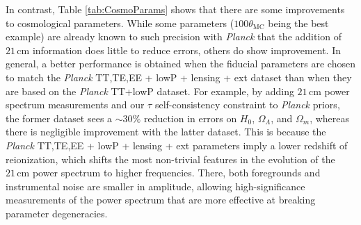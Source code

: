 \documentclass[twocolumn,aps,prd,nofootinbib,showpacs]{revtex4-1}
\begin{document}
In contrast, Table \ref{tab:CosmoParams} shows that there are some improvements to cosmological parameters. While some parameters ($100 \theta_\textrm{MC}$ being the best example) are already known to such precision with \emph{Planck} that the addition of $21\,\textrm{cm}$ information does little to reduce errors, others do show improvement. In general, a better performance is obtained when the fiducial parameters are chosen to match the \emph{Planck} TT,TE,EE + lowP + lensing + ext dataset than when they are based on the \emph{Planck} TT+lowP dataset. For example, by adding $21\,\textrm{cm}$ power spectrum measurements and our $\tau$ self-consistency constraint to \emph{Planck} priors, the former dataset sees a $\sim 30\%$ reduction in errors on $H_0$, $\Omega_\Lambda$, and $\Omega_m$, whereas there is negligible improvement with the latter dataset. This is because the \emph{Planck} TT,TE,EE + lowP + lensing + ext parameters imply a lower redshift of reionization, which shifts the most non-trivial features in the evolution of the $21\,\textrm{cm}$ power spectrum to higher frequencies. There, both foregrounds and instrumental noise are smaller in amplitude, allowing high-significance measurements of the power spectrum that are more effective at breaking parameter degeneracies.
\end{document}
